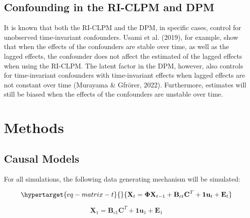 \documentclass[
]{interact}
\begin{document}
\hypertarget{confounding-in-the-ri-clpm-and-dpm}{%
\subsection{Confounding in the RI-CLPM and
DPM}\label{confounding-in-the-ri-clpm-and-dpm}}

It is known that both the RI-CLPM and the DPM, in specific cases,
control for unobserved time-invariant confounders. Usami et al. (2019),
for example, show that when the effects of the confounders are stable
over time, as well as the lagged effects, the confounder does not affect
the estimated of the lagged effects when using the RI-CLPM. The latent
factor in the DPM, however, also controls for time-invariant confounders
with time-invariant effects when lagged effects are not constant over
time (Murayama \& Gfrörer, 2022). Furthermore, estimates will still be
biased when the effects of the confounders are unstable over time.

\hypertarget{methods}{%
\section{Methods}\label{methods}}

\hypertarget{causal-models}{%
\subsection{Causal Models}\label{causal-models}}

For all simulations, the following data generating mechanism will be
simulated:

\begin{equation}\protect\hypertarget{eq-matrix-t}{}{
\textbf{X}_t = \boldsymbol{\Phi}\textbf{X}_{t-1} + \textbf{B}_{ct}\textbf{C}^T + \textbf{1}\textbf{u}_t + \textbf{E}_t
}\label{eq-matrix-t}\end{equation}

\[
\textbf{X}_1 = \textbf{B}_{c1}\textbf{C}^T + \textbf{1}\textbf{u}_1 + \textbf{E}_1
\]
\end{document}
